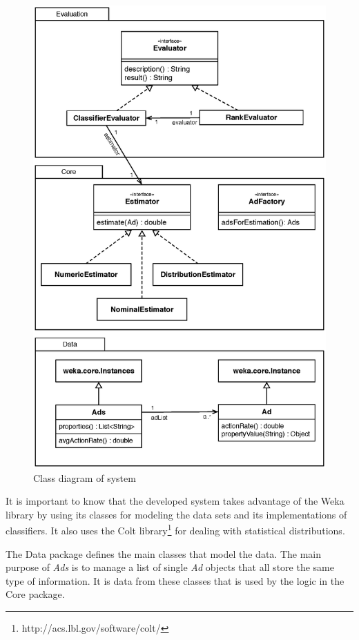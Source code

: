 \documentclass{sig-alternate}
\begin{document}
\begin{figure}[htb]
	\centering
	\includegraphics[width=\columnwidth]{class-diagram.eps}
	\caption{Class diagram of system}
	\label{fig:ClassDiagram}
\end{figure}

It is important to know that the developed system takes advantage of the Weka library \citep{Garner1995} by using its classes for modeling the data sets and its implementations of classifiers. It also uses the Colt library\footnote{http://acs.lbl.gov/software/colt/} for dealing with statistical distributions.

The Data package defines the main classes that model the data. The main purpose of \textit{Ads} is to manage a list of single \textit{Ad} objects that all store the same type of information. It is data from these classes that is used by the logic in the Core package.
\end{document}
